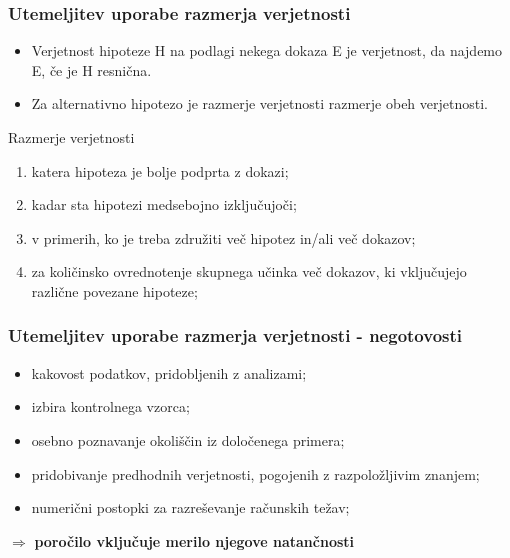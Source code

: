 \documentclass{beamer}
\begin{document}
\begin{frame}
    \frametitle{Utemeljitev uporabe razmerja verjetnosti}
        \begin{itemize}
            \item Verjetnost hipoteze H na podlagi nekega dokaza E je verjetnost, da najdemo E, če je H resnična.
            \item Za alternativno hipotezo je razmerje verjetnosti razmerje obeh verjetnosti.
        \end{itemize} \vspace{3mm}
        \begin{block}{Razmerje verjetnosti}
            \begin{enumerate}
                \item katera hipoteza je bolje podprta z dokazi;
                \item kadar sta hipotezi medsebojno izključujoči;
                \item v primerih, ko je treba združiti več hipotez in/ali več dokazov;
                \item za količinsko ovrednotenje skupnega učinka več dokazov, ki vključujejo različne povezane hipoteze;
            \end{enumerate} \vspace{3mm}
        \end{block}
\end{frame}

\begin{frame}
    \frametitle{Utemeljitev uporabe razmerja verjetnosti - negotovosti}
        \begin{itemize}
            \item kakovost podatkov, pridobljenih z analizami;
            \item izbira kontrolnega vzorca;
            \item osebno poznavanje okoliščin iz določenega primera;
            \item pridobivanje predhodnih verjetnosti, pogojenih z razpoložljivim znanjem;
            \item numerični postopki za razreševanje računskih težav;
        \end{itemize} \vspace{2mm}
        \begin{block}{}
            \centering
            $\Rightarrow$ \textbf{poročilo vključuje merilo njegove natančnosti}        
        \end{block}
\end{frame}
\end{document}
